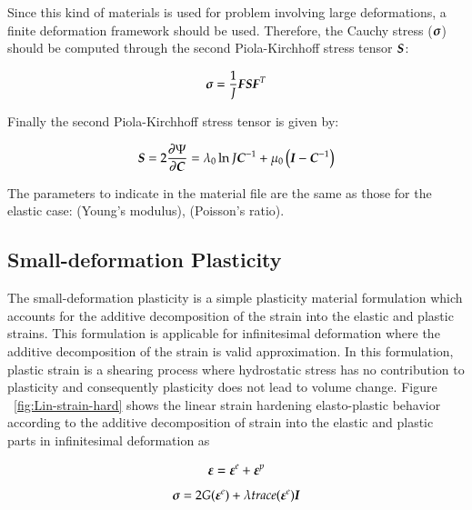 Since this kind of materials is used for problem involving large deformations, a finite
deformation framework should be used. Therefore, the Cauchy stress ($\boldsymbol{\sigma}$) should
be computed through the second Piola-Kirchhoff stress tensor $\boldsymbol{S}$:

\begin{equation}
  \boldsymbol{\sigma } = \frac{1}{J}\boldsymbol{F}\boldsymbol{S}\boldsymbol{F}^T
\end{equation}

Finally the second Piola-Kirchhoff stress tensor is given by:

\begin{equation}
  \boldsymbol{S}  = 2\frac{\partial\Psi}{\partial\boldsymbol{C}} = \lambda_0\ln J 
\boldsymbol{C}^{-1}+\mu_0\left(\boldsymbol{I}-\boldsymbol{C}^{-1}\right)
\end{equation}

The parameters to indicate in the material file are the same
as those for the elastic case:  (Young's modulus),  (Poisson's
ratio).

\subsection{Small-deformation Plasticity}

The small-deformation plasticity is a simple plasticity material formulation which accounts for the additive decomposition of the strain into the elastic and plastic strains. This formulation is applicable for infinitesimal deformation where the additive decomposition of the strain is valid approximation. In this formulation, plastic strain is a shearing process where hydrostatic stress has no contribution to plasticity and consequently plasticity does not lead to
volume change. Figure ~\ref{fig:Lin-strain-hard} shows the linear strain hardening elasto-plastic behavior according to the additive decomposition of strain into the elastic and plastic parts in infinitesimal deformation as

\begin{equation} \label{strain decomposition}
	\boldsymbol{\varepsilon} = \boldsymbol{\varepsilon}^e +\boldsymbol{\varepsilon}^p
\end{equation}  
\begin{equation} \label{Hooks law}
	{\ensuremath{\boldsymbol{\sigma}}} = 2G(\boldsymbol{\varepsilon}^e) + \lambda  trace(\boldsymbol{\varepsilon}^e)\boldsymbol{I}
\end{equation}

